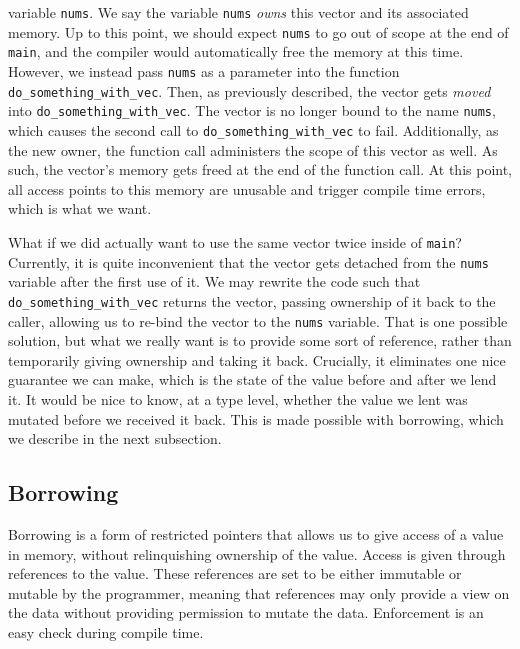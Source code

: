 \documentclass[letterpaper,11pt]{article}
\begin{document}
variable \texttt{nums}. We say the variable \texttt{nums} \textit{owns} this
vector and its associated memory. Up to this point, we should expect \texttt{nums}
to go out of scope at the end of \texttt{main}, and the compiler would automatically
free the memory at this time. However, we instead pass \texttt{nums} as a parameter
into the function \texttt{do\_something\_with\_vec}. Then, as previously described,
the vector gets \textit{moved} into \texttt{do\_something\_with\_vec}. The vector is
no longer bound to the name \texttt{nums}, which causes the second call to
\texttt{do\_something\_with\_vec} to fail. Additionally, as the new owner, the
function call administers the scope of this vector as well. As such, the vector's
memory gets freed at the end of the function call. At this point, all access points to this memory are unusable and trigger compile time errors, which is what we want.

What if we did actually want to use the same vector twice inside of \texttt{main}?
Currently, it is quite inconvenient that the vector gets detached from the \texttt{nums}
variable after the first use of it. We may rewrite the code such that
\texttt{do\_something\_with\_vec} returns the vector, passing ownership of it back
to the caller, allowing us to re-bind the vector to the \texttt{nums} variable.
That is one possible solution, but what we really want is to provide some sort
of reference, rather than temporarily giving ownership and taking it back.
Crucially, it eliminates one nice guarantee we can make, which is the state
of the value before and after we lend it. It would be nice to know, at a type level,
whether the value we lent was mutated before we received it back. This is made
possible with borrowing, which we describe in the next subsection.

\subsection{Borrowing}
Borrowing is a form of restricted pointers that allows us to give access of a value
in memory, without relinquishing ownership of the value. Access is given through
references to the value. These references are set to be either immutable or mutable
by the programmer, meaning that references may only provide a view on the data
without providing permission to mutate the data. Enforcement is an easy check during
compile time.
\end{document}
